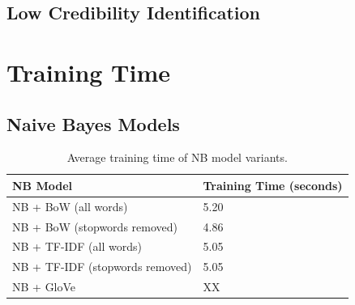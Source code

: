 \documentclass[a4paper,twoside,phd]{BYUPhys}
\begin{document}
\subsection{Low Credibility Identification}
\label{sec:LowCredibilityIdentificationResults}


\section{Training Time}
\label{sec:TrainingTime}

\subsection{Naive Bayes Models}
\label{sec:TrainingTimeNB}

\begin{table}[]
	\centering
	
	\begin{tabular}{|p{4.2cm}|p{5cm}|}
		\hline
		
		\textbf{NB Model} & \textbf{Training Time (seconds)}                                                                                                                                                                                                                                                                                                                                                    \\
		\hline                                                                                                                                              
		
		NB + BoW (all words)  & 5.20  \\
		\hline
		
		NB + BoW \newline (stopwords  removed)  & 4.86  \\
		\hline
		
		NB + TF-IDF \newline (all words) & 5.05 \\
		\hline
		
		NB + TF-IDF \newline (stopwords removed) & 5.05 \\
		\hline
		
		NB + GloVe & XX \\
		\hline
		
		
	\end{tabular}
	\caption{Average training time of NB model variants.}
	\label{table:NBTrainingTime}
\end{table}
\end{document}
